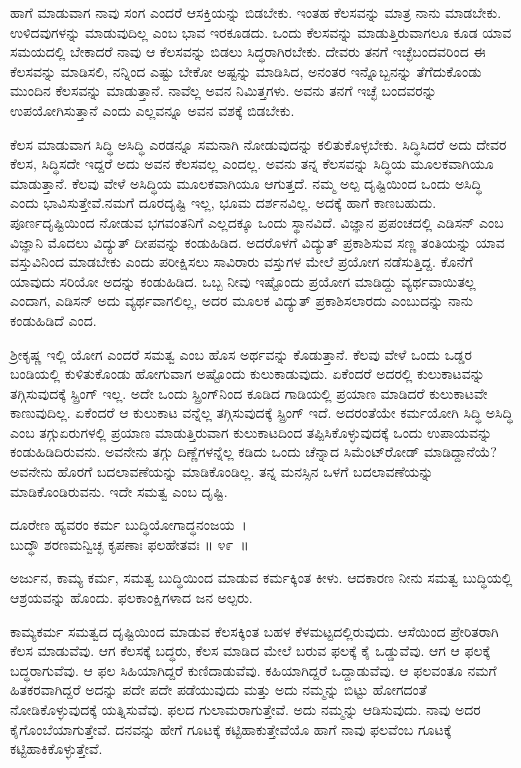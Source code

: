 ಹಾಗೆ ಮಾಡುವಾಗ ನಾವು ಸಂಗ ಎಂದರೆ ಆಸಕ್ತಿಯನ್ನು ಬಿಡಬೇಕು. ಇಂತಹ ಕೆಲಸವನ್ನು ಮಾತ್ರ ನಾನು ಮಾಡಬೇಕು. ಉಳಿದವುಗಳನ್ನು ಮಾಡುವುದಿಲ್ಲ ಎಂಬ ಭಾವ ಇರಕೂಡದು. ಒಂದು ಕೆಲಸವನ್ನು ಮಾಡುತ್ತಿರುವಾಗಲೂ ಕೂಡ ಯಾವ ಸಮಯದಲ್ಲಿ ಬೇಕಾದರೆ ನಾವು ಆ ಕೆಲಸವನ್ನು ಬಿಡಲು ಸಿದ್ಧರಾಗಿರಬೇಕು. ದೇವರು ತನಗೆ ಇಚ್ಛೆಬಂದವರಿಂದ ಈ ಕೆಲಸವನ್ನು ಮಾಡಿಸಲಿ, ನನ್ನಿಂದ ಎಷ್ಟು ಬೇಕೋ ಅಷ್ಟನ್ನು ಮಾಡಿಸಿದ, ಅನಂತರ ಇನ್ನೊಬ್ಬನನ್ನು ತೆಗೆದುಕೊಂಡು ಮುಂದಿನ ಕೆಲಸವನ್ನು ಮಾಡುತ್ತಾನೆ. ನಾವೆಲ್ಲ ಅವನ ನಿಮಿತ್ತಗಳು. ಅವನು ತನಗೆ ಇಚ್ಛೆ ಬಂದವರನ್ನು ಉಪಯೋಗಿಸುತ್ತಾನೆ ಎಂದು ಎಲ್ಲವನ್ನೂ ಅವನ ವಶಕ್ಕೆ ಬಿಡಬೇಕು.

ಕೆಲಸ ಮಾಡುವಾಗ ಸಿದ್ಧಿ ಅಸಿದ್ಧಿ ಎರಡನ್ನೂ ಸಮನಾಗಿ ನೋಡುವುದನ್ನು ಕಲಿತುಕೊಳ್ಳಬೇಕು. ಸಿದ್ಧಿಸಿದರೆ ಅದು ದೇವರ ಕೆಲಸ, ಸಿದ್ಧಿಸದೇ ಇದ್ದರೆ ಅದು ಅವನ ಕೆಲಸವಲ್ಲ ಎಂದಲ್ಲ. ಅವನು ತನ್ನ ಕೆಲಸವನ್ನು ಸಿದ್ಧಿಯ ಮೂಲಕವಾಗಿಯೂ ಮಾಡುತ್ತಾನೆ. ಕೆಲವು ವೇಳೆ ಅಸಿದ್ಧಿಯ ಮೂಲಕವಾಗಿಯೂ ಆಗುತ್ತದೆ. ನಮ್ಮ ಅಲ್ಪ ದೃಷ್ಟಿಯಿಂದ ಒಂದು ಅಸಿದ್ಧಿ ಎಂದು ಭಾವಿಸುತ್ತೇವೆ.\break ನಮಗೆ ದೂರದೃಷ್ಟಿ ಇಲ್ಲ, ಭೂಮ ದರ್ಶನವಿಲ್ಲ. ಅದಕ್ಕೆ ಹಾಗೆ ಕಾಣಬಹುದು. ಪೂರ್ಣದೃಷ್ಟಿಯಿಂದ ನೋಡುವ ಭಗವಂತನಿಗೆ ಎಲ್ಲದಕ್ಕೂ ಒಂದು ಸ್ಥಾನವಿದೆ. ವಿಜ್ಞಾನ ಪ್ರಪಂಚದಲ್ಲಿ ಎಡಿಸನ್ ಎಂಬ ವಿಜ್ಞಾನಿ ಮೊದಲು ವಿದ್ಯುತ್ ದೀಪವನ್ನು ಕಂಡುಹಿಡಿದ. ಅದರೊಳಗೆ ವಿದ್ಯುತ್ ಪ್ರಕಾಶಿಸುವ ಸಣ್ಣ ತಂತಿಯನ್ನು ಯಾವ ವಸ್ತುವಿನಿಂದ ಮಾಡಬೇಕು ಎಂದು ಪರೀಕ್ಷಿಸಲು ಸಾವಿರಾರು ವಸ್ತುಗಳ ಮೇಲೆ ಪ್ರಯೋಗ ನಡೆಸುತ್ತಿದ್ದ. ಕೊನೆಗೆ ಯಾವುದು ಸರಿಯೋ ಅದನ್ನು ಕಂಡುಹಿಡಿದ. ಒಬ್ಬ ನೀವು ಇಷ್ಟೊಂದು ಪ್ರಯೋಗ ಮಾಡಿದ್ದು ವ್ಯರ್ಥವಾಯಿತಲ್ಲ ಎಂದಾಗ, ಎಡಿಸನ್ ಅದು ವ್ಯರ್ಥವಾಗಲಿಲ್ಲ, ಅದರ ಮೂಲಕ ವಿದ್ಯುತ್ ಪ್ರಕಾಶಿಸಲಾರದು ಎಂಬುದನ್ನು ನಾನು ಕಂಡುಹಿಡಿದೆ ಎಂದ.

ಶ‍್ರೀಕೃಷ್ಣ ಇಲ್ಲಿ ಯೋಗ ಎಂದರೆ ಸಮತ್ವ ಎಂಬ ಹೊಸ ಅರ್ಥವನ್ನು ಕೊಡುತ್ತಾನೆ. ಕೆಲವು ವೇಳೆ ಒಂದು ಒಡ್ಡರ ಬಂಡಿಯಲ್ಲಿ ಕುಳಿತುಕೊಂಡು ಹೋಗುವಾಗ ಅಷ್ಟೊಂದು ಕುಲುಕಾಡುವುದು. ಏಕೆಂದರೆ ಅದರಲ್ಲಿ ಕುಲುಕಾಟವನ್ನು ತಗ್ಗಿಸುವುದಕ್ಕೆ ಸ್ಪ್ರಿಂಗ್ ಇಲ್ಲ. ಅದೇ ಒಂದು ಸ್ಪ್ರಿಂಗ್​ನಿಂದ ಕೂಡಿದ ಗಾಡಿಯಲ್ಲಿ ಪ್ರಯಾಣ ಮಾಡಿದರೆ ಕುಲುಕಾಟವೇ ಕಾಣುವುದಿಲ್ಲ. ಏಕೆಂದರೆ ಆ ಕುಲುಕಾಟ ವನ್ನೆಲ್ಲ ತಗ್ಗಿಸುವುದಕ್ಕೆ ಸ್ಪ್ರಿಂಗ್ ಇದೆ. ಅದರಂತೆಯೇ ಕರ್ಮಯೋಗಿ ಸಿದ್ಧಿ ಅಸಿದ್ಧಿ ಎಂಬ ತಗ್ಗುಏರುಗಳಲ್ಲಿ ಪ್ರಯಾಣ ಮಾಡುತ್ತಿರುವಾಗ ಕುಲುಕಾಟದಿಂದ ತಪ್ಪಿಸಿಕೊಳ್ಳುವುದಕ್ಕೆ ಒಂದು ಉಪಾಯವನ್ನು ಕಂಡುಹಿಡಿದಿರುವನು. ಅವನೇನು ತಗ್ಗು ದಿಣ್ಣೆಗಳನ್ನೆಲ್ಲ ಕಡಿದು ಒಂದು ಚೆನ್ನಾದ ಸಿಮೆಂಟ್​ರೋಡ್ ಮಾಡಿದ್ದಾನೆಯೆ? ಅವನೇನು ಹೊರಗೆ ಬದಲಾವಣೆಯನ್ನು ಮಾಡಿಕೊಂಡಿಲ್ಲ. ತನ್ನ ಮನಸ್ಸಿನ ಒಳಗೆ ಬದಲಾವಣೆಯನ್ನು ಮಾಡಿಕೊಂಡಿರುವನು. ಇದೇ ಸಮತ್ವ ಎಂಬ ದೃಷ್ಟಿ.

\begin{shloka}
ದೂರೇಣ ಹ್ಯವರಂ ಕರ್ಮ ಬುದ್ಧಿಯೋಗಾದ್ಧನಂಜಯ~।\\ಬುದ್ಧೌ ಶರಣಮನ್ವಿಚ್ಛ ಕೃಪಣಾಃ ಫಲಹೇತವಃ \hfill॥ ೪೯~॥
\end{shloka}

\begin{artha}
ಅರ್ಜುನ, ಕಾಮ್ಯ ಕರ್ಮ, ಸಮತ್ವ ಬುದ್ಧಿಯಿಂದ ಮಾಡುವ ಕರ್ಮಕ್ಕಿಂತ ಕೀಳು. ಆದಕಾರಣ ನೀನು ಸಮತ್ವ ಬುದ್ಧಿಯಲ್ಲಿ ಆಶ್ರಯವನ್ನು ಹೊಂದು. ಫಲಕಾಂಕ್ಷಿಗಳಾದ ಜನ ಅಲ್ಪರು.
\end{artha}

ಕಾಮ್ಯಕರ್ಮ ಸಮತ್ವದ ದೃಷ್ಟಿಯಿಂದ ಮಾಡುವ ಕೆಲಸಕ್ಕಿಂತ ಬಹಳ ಕೆಳಮಟ್ಟದಲ್ಲಿರುವುದು. ಆಸೆಯಿಂದ ಪ್ರೇರಿತರಾಗಿ ಕೆಲಸ ಮಾಡುವೆವು. ಆಗ ಕೆಲಸಕ್ಕೆ ಬದ್ಧರು, ಕೆಲಸ ಮಾಡಿದ ಮೇಲೆ ಬರುವ ಫಲಕ್ಕೆ ಕೈ ಒಡ್ಡುವೆವು. ಆಗ ಆ ಫಲಕ್ಕೆ ಬದ್ಧರಾಗುವೆವು. ಆ ಫಲ ಸಿಹಿಯಾಗಿದ್ದರೆ ಕುಣಿದಾಡುವೆವು. ಕಹಿಯಾಗಿದ್ದರೆ ಒದ್ದಾಡುವೆವು. ಆ ಫಲವಂತೂ ನಮಗೆ ಹಿತಕರವಾಗಿದ್ದರೆ ಅದನ್ನು ಪದೇ ಪದೇ ಪಡೆಯುವುದು ಮತ್ತು ಅದು ನಮ್ಮನ್ನು ಬಿಟ್ಟು ಹೋಗದಂತೆ ನೋಡಿಕೊಳ್ಳುವುದಕ್ಕೆ ಯತ್ನಿಸುವೆವು. ಫಲದ ಗುಲಾಮರಾಗುತ್ತೇವೆ. ಅದು ನಮ್ಮನ್ನು ಆಡಿಸುವುದು. ನಾವು ಅದರ ಕೈಗೊಂಬೆಯಾಗುತ್ತೇವೆ. ದನವನ್ನು ಹೇಗೆ ಗೂಟಕ್ಕೆ ಕಟ್ಟಿಹಾಕುತ್ತೇವೆಯೊ ಹಾಗೆ ನಾವು ಫಲವೆಂಬ ಗೂಟಕ್ಕೆ ಕಟ್ಟಿಹಾಕಿಕೊಳ್ಳುತ್ತೇವೆ.


